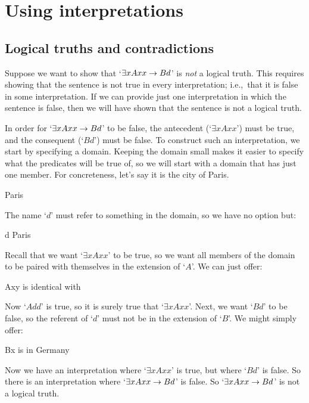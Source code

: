 \chapter{Using interpretations}
\label{sec.UsingModels}

\section{Logical truths and contradictions}
Suppose we want to show that `$\exists xAxx \rightarrow Bd$' is \emph{not} a logical truth. This requires showing that the sentence is not true in every interpretation; i.e.,\ that it is false in some interpretation. If we can provide just one interpretation in which the sentence is false, then we will have shown that the sentence is not a logical truth.

In order for `$\exists xAxx \rightarrow Bd$' to be false, the antecedent (`$\exists x Axx$') must be true, and the consequent (`$Bd$') must be false. To construct such an interpretation, we start by specifying a domain. Keeping the domain small makes it easier to specify what the predicates will be true of, so we will start with a domain that has just one member. For concreteness, let's say it is the city of Paris. 
	\begin{ekey}
		\item[\text{domain}] Paris
	\end{ekey}
The name `$d$' must refer to something in the domain, so we have no option but:
	\begin{ekey}
		\item[d] Paris
	\end{ekey}
Recall that we want `$\exists x Axx$' to be true, so we want all members of the domain to be paired with themselves in the extension of `$A$'. We can just offer:
	\begin{ekey}
		\item[Axy]  is identical with 
	\end{ekey}
Now `$Add$' is true, so it is surely true that `$\exists x Axx$'. Next, we want `$Bd$' to be false, so the referent of `$d$' must not be in the extension of `$B$'. We might simply offer:
	\begin{ekey}
		\item[Bx]  is in Germany
	\end{ekey}
Now we have an interpretation where `$\exists x Axx$' is true, but where `$Bd$' is false. So there is an interpretation where `$\exists x Axx \rightarrow Bd$' is false. So `$\exists x Axx \rightarrow Bd$' is not a logical truth.

